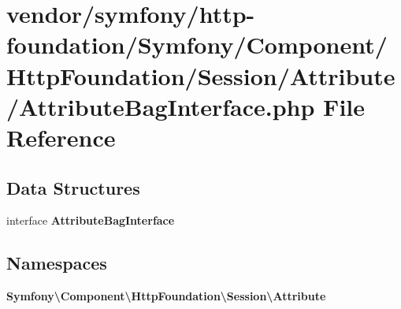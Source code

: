 \section{vendor/symfony/http-\/foundation/\+Symfony/\+Component/\+Http\+Foundation/\+Session/\+Attribute/\+Attribute\+Bag\+Interface.php File Reference}
\label{_attribute_bag_interface_8php}
\subsection*{Data Structures}
\begin{DoxyCompactItemize}
\item 
interface {\bf Attribute\+Bag\+Interface}
\end{DoxyCompactItemize}
\subsection*{Namespaces}
\begin{DoxyCompactItemize}
\item 
 {\bf Symfony\textbackslash{}\+Component\textbackslash{}\+Http\+Foundation\textbackslash{}\+Session\textbackslash{}\+Attribute}
\end{DoxyCompactItemize}
